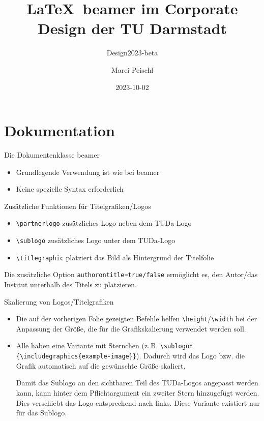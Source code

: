 \documentclass[
	german,%
	accentcolor=9c,%
]{tudabeamer}
\title[TUDaBeamer2023]{\LaTeX~beamer im Corporate Design der TU Darmstadt}
\subtitle{Design2023-beta}
\author[M. Peischl]{Marei Peischl}
\institute{pei\TeX}
\date{2023-10-02}%
\newcommand*{\code}[1]{\texttt{#1}}
\begin{document}
\maketitle

\tableofcontents

\section{Dokumentation}

\begin{frame}{Die Dokumentenklasse beamer}
\begin{itemize}
	\item Grundlegende Verwendung ist wie bei beamer
	\item Keine spezielle Syntax erforderlich
\end{itemize}
\end{frame}

\begin{frame}{Zusätzliche Funktionen für Titelgrafiken/Logos}
\begin{itemize}
	\item \code{\textbackslash{}partnerlogo} zusätzliches Logo neben dem TUDa-Logo
	\item \code{\textbackslash{}sublogo} zusätzliches Logo unter dem TUDa-Logo
	\item \code{\textbackslash{}titlegraphic} platziert das Bild als Hintergrund der Titelfolie
\end{itemize}
Die zusätzliche Option \code{authorontitle=true/false} ermöglicht es, den Autor/das Institut unterhalb des Titels zu platzieren.
\end{frame}

\begin{frame}{Skalierung von Logos/Titelgrafiken}
\begin{itemize}
	\item Die auf der vorherigen Folie gezeigten Befehle helfen \code{\textbackslash{}height}/\code{\textbackslash{}width} bei der Anpassung der Größe, die für die Grafikskalierung verwendet werden soll.
	\item Alle haben eine Variante mit Sternchen (z.\,B. \code{\textbackslash{}sublogo*\{\textbackslash{}includegraphics\{example-image\}\}}). Dadurch wird das Logo bzw. die Grafik automatisch auf die gewünschte Größe skaliert.

	      Damit das Sublogo an den sichtbaren Teil des TUDa-Logos angepasst werden kann, kann hinter dem Pflichtargument ein zweiter Stern hinzugefügt werden. Dies verschiebt das Logo entsprechend nach links. Diese Variante existiert nur für das Sublogo.
\end{itemize}
\end{frame}
\end{document}
